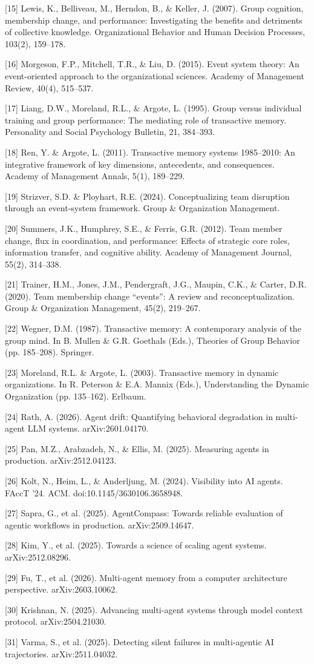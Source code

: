 [15] Lewis, K., Belliveau, M., Herndon, B., \& Keller, J. (2007). Group cognition, membership change, and performance: Investigating the benefits and detriments of collective knowledge. Organizational Behavior and Human Decision Processes, 103(2), 159--178.

[16] Morgeson, F.P., Mitchell, T.R., \& Liu, D. (2015). Event system theory: An event-oriented approach to the organizational sciences. Academy of Management Review, 40(4), 515--537.

[17] Liang, D.W., Moreland, R.L., \& Argote, L. (1995). Group versus individual training and group performance: The mediating role of transactive memory. Personality and Social Psychology Bulletin, 21, 384--393.

[18] Ren, Y. \& Argote, L. (2011). Transactive memory systems 1985--2010: An integrative framework of key dimensions, antecedents, and consequences. Academy of Management Annals, 5(1), 189--229.

[19] Strizver, S.D. \& Ployhart, R.E. (2024). Conceptualizing team disruption through an event-system framework. Group \& Organization Management.

[20] Summers, J.K., Humphrey, S.E., \& Ferris, G.R. (2012). Team member change, flux in coordination, and performance: Effects of strategic core roles, information transfer, and cognitive ability. Academy of Management Journal, 55(2), 314--338.

[21] Trainer, H.M., Jones, J.M., Pendergraft, J.G., Maupin, C.K., \& Carter, D.R. (2020). Team membership change ``events'': A review and reconceptualization. Group \& Organization Management, 45(2), 219--267.

[22] Wegner, D.M. (1987). Transactive memory: A contemporary analysis of the group mind. In B. Mullen \& G.R. Goethals (Eds.), Theories of Group Behavior (pp. 185--208). Springer.

[23] Moreland, R.L. \& Argote, L. (2003). Transactive memory in dynamic organizations. In R. Peterson \& E.A. Mannix (Eds.), Understanding the Dynamic Organization (pp. 135--162). Erlbaum.

[24] Rath, A. (2026). Agent drift: Quantifying behavioral degradation in multi-agent LLM systems. arXiv:2601.04170.

[25] Pan, M.Z., Arabzadeh, N., \& Ellis, M. (2025). Measuring agents in production. arXiv:2512.04123.

[26] Kolt, N., Heim, L., \& Anderljung, M. (2024). Visibility into AI agents. FAccT '24. ACM. doi:10.1145/3630106.3658948.

[27] Sapra, G., et al. (2025). AgentCompass: Towards reliable evaluation of agentic workflows in production. arXiv:2509.14647.

[28] Kim, Y., et al. (2025). Towards a science of scaling agent systems. arXiv:2512.08296.

[29] Fu, T., et al. (2026). Multi-agent memory from a computer architecture perspective. arXiv:2603.10062.

[30] Krishnan, N. (2025). Advancing multi-agent systems through model context protocol. arXiv:2504.21030.

[31] Varma, S., et al. (2025). Detecting silent failures in multi-agentic AI trajectories. arXiv:2511.04032.

